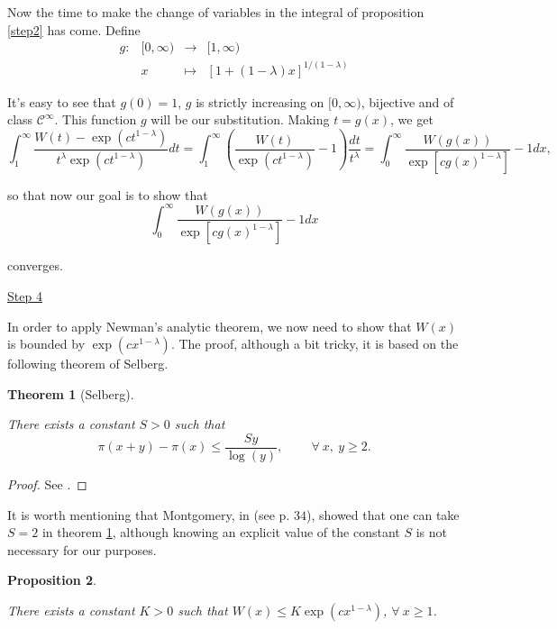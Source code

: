 \documentclass[11pt]{amsart}
\newtheorem{theorem}{Theorem}[section]
\newtheorem{proposition}[theorem]{Proposition}
\numberwithin{equation}{section}
\newcommand{\diint}{\displaystyle \int}
\newcommand{\difrac}{\displaystyle \frac}
\begin{document}
Now the time to make the change of variables in the integral of proposition \ref{step2} has come. Define $$\begin{matrix}
g: & [0, \infty) & \rightarrow & [1, \infty)\\ & x & \mapsto & [1 + (1 - \lambda)x]^{1/(1 - \lambda)} \end{matrix}$$

It's easy to see that $g(0) = 1$, $g$ is strictly increasing on $[0, \infty)$, bijective and of class $\mathscr{C}^{\infty}$. This function $g$ will be our substitution. Making $t = g(x)$, we get $$\diint_{1}^{\infty} \difrac{W(t) - \exp(ct^{1 - \lambda})}{t^{\lambda}\exp(ct^{1 - \lambda})} dt = \diint_{1}^{\infty} \left(\difrac{W(t)}{\exp(ct^{1 - \lambda})} - 1\right) \difrac{dt}{t^{\lambda}} = \diint_{0}^{\infty} \difrac{W(g(x))}{\exp[cg(x)^{1 - \lambda}]} - 1 dx,$$

\noindent so that now our goal is to show that $$\diint_{0}^{\infty} \difrac{W(g(x))}{\exp[cg(x)^{1 - \lambda}]} - 1 dx$$

\noindent converges.

\begin{center} \underline{Step 4} \end{center}

In order to apply Newman's analytic theorem, we now need to show that $W(x)$ is bounded by $\exp(cx^{1 - \lambda})$. The proof, although a bit tricky, it is based on the following theorem of Selberg.

\begin{theorem} [Selberg] \label{selberg}

There exists a constant $S > 0$ such that $$\pi(x+y) - \pi(x) \leq \difrac{Sy}{\log(y)}, \qquad \ \forall \ x, \ y \geq 2.$$

\end{theorem}

\begin{proof} See \cite{Selberg}. \end{proof}

It is worth mentioning that Montgomery, in \cite{Montgomery} (see p. $34$), showed that one can take $S = 2$ in theorem \ref{selberg}, although knowing an explicit value of the constant $S$ is not necessary for our purposes.

\begin{proposition} \label{mystep3}

There exists a constant $K > 0$ such that $W(x) \leq K\exp(cx^{1 - \lambda})$, $\forall \ x \geq 1$.

\end{proposition}
\end{document}
